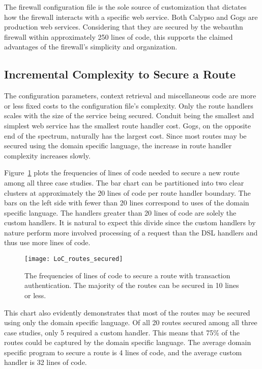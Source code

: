 The firewall configuration file is the sole source of customization that dictates how the firewall interacts with a specific web service. Both Calypso and Gogs are production web services. Considering that they are secured by the webauthn firewall within approximately 250 lines of code, this supports the claimed advantages of the firewall's simplicity and organization. 

\subsection{Incremental Complexity to Secure a Route}

The configuration parameters, context retrieval and miscellaneous code are more or less fixed costs to the configuration file's complexity. Only the route handlers scales with the size of the service being secured. Conduit being the smallest and simplest web service has the smallest route handler cost. Gogs, on the opposite end of the spectrum, naturally has the largest cost. Since most routes may be secured using the domain specific language, the increase in route handler complexity increases slowly.

Figure~\ref{Fig:IncrementalComplexity} plots the frequencies of lines of code needed to secure a new route among all three case studies. The bar chart can be partitioned into two clear clusters at approximately the 20 lines of code per route handler boundary. The bars on the left side with fewer than 20 lines correspond to uses of the domain specific language. The handlers greater than 20 lines of code are solely the custom handlers. It is natural to expect this divide since the custom handlers by nature perform more involved processing of a request than the DSL handlers and thus use more lines of code.


\begin{figure}[h]
  \centering
  \texttt{[image: LoC\_routes\_secured]}
  \caption{The frequencies of lines of code to secure a route with transaction authentication. The majority of the routes can be secured in 10 lines or less.}
  \label{Fig:IncrementalComplexity}
\end{figure}

This chart also evidently demonstrates that most of the routes may be secured using only the domain specific language. Of all 20 routes secured among all three case studies, only 5 required a custom handler. This means that 75\% of the routes could be captured by the domain specific language. The average domain specific program to secure a route is 4 lines of code, and the average custom handler is 32 lines of code.

